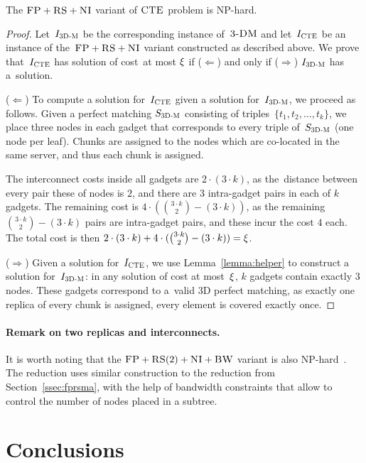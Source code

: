 \begin{theorem}
\label{theorem:fp_rs_cc}
The $\textsc{FP}+\textsc{RS}+\textsc{NI}$ variant of $\textsc{CTE}$ problem is NP-hard.
\end{theorem}
\begin{proof}
Let~$I_{\mathrm{\textsc{3D-M}}}$ be the corresponding instance of~$\textsc{3-DM}$ and let~$I_{\mathrm{\textsc{CTE}}}$ be an instance of
the~$\textsc{FP}+\textsc{RS}+\textsc{NI}$ variant constructed as described above.
We prove that~$I_{\mathrm{\textsc{CTE}}}$ has solution of cost~at most $\xi$ if ($\Leftarrow$) and only if
($\Rightarrow$)
$I_{\mathrm{\textsc{3D-M}}}$ has a~solution.

($\Leftarrow$) To compute a solution
for~$I_{\mathrm{\textsc{CTE}}}$ given a solution for~$I_{\mathrm{\textsc{3D-M}}}$, we proceed as follows.
Given a perfect matching $S_{\mathrm{\textsc{3D-M}}}$ consisting of triples~$ \{t_1, t_2,
\ldots, t_k\}$, we place three nodes in each gadget that
corresponds to every triple of~$S_{\mathrm{\textsc{3D-M}}}$ (one node per leaf). Chunks are assigned to the nodes which are co-located
in the same server, and thus each chunk is assigned.

The interconnect costs inside all gadgets are $2\cdot (3 \cdot k)$,
as the~distance between every pair these of nodes is $2$, and there are $3$ intra-gadget pairs in each of $k$ gadgets.
The remaining cost is $4\cdot({ 3\cdot k \choose 2} - (3\cdot k))$, as the remaining ${ 3\cdot k \choose 2} - (3\cdot k)$ pairs are intra-gadget pairs, and these incur the cost $4$ each.
The total cost is then $2\cdot (3\cdot k) + 4\cdot({ 3\cdot k \choose 2} - (3\cdot k)) = \xi$.

($\Rightarrow$) Given a solution for~$I_{\mathrm{\textsc{CTE}}}$,
we use Lemma~\ref{lemma:helper} to construct a solution for~$I_{\mathrm{\textsc{3D-M}}}$: in any solution of cost at most~$\xi$,
$k$ gadgets contain exactly 3 nodes. These gadgets correspond to a~valid
3D perfect matching, as exactly one replica of every chunk is assigned, every element is covered exactly once.
\end{proof}

\paragraph{Remark on two replicas and interconnects.}
It is worth noting that the $\textsc{FP}+\textsc{RS}(2)+\textsc{NI}+\textsc{BW}$ variant is also NP-hard~\cite{my-tcs}.
The reduction uses similar construction to the reduction from Section~\ref{ssec:fprsma},
with the help of bandwidth constraints that allow to control the number of nodes placed in a subtree.

\section{Conclusions}\label{sec:conclusion-static}


